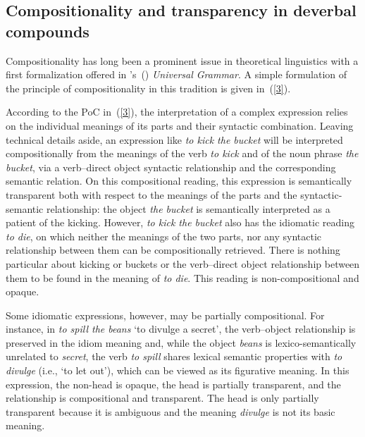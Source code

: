 \documentclass[output=paper]{langsci/langscibook}
\begin{document}
\subsection{Compositionality and transparency in deverbal compounds}\label{sec:intro:compositionality}

Compositionality has long been a prominent issue in theoretical linguistics with a first formalization offered in \citeauthor{montague:70}'s~(\citeyear{montague:70}) \textit{Universal Grammar}.
A simple formulation of the principle of compositionality in this tradition  {is given in~(\ref{3})}.

\begin{exe}
\end{exe}

According to the PoC in~(\ref{3}), the interpretation of a complex expression relies on the individual meanings of its parts and their syntactic combination. Leaving technical details aside, an expression like \textit{to kick the bucket} will be interpreted compositionally from the meanings of the verb \textit{to kick} and of the noun phrase \textit{the bucket}, via a verb--direct object syntactic relationship and the corresponding semantic relation. On this compositional reading, this expression is semantically transparent both with respect to the  meanings of the parts and the syntactic-semantic relationship: the object \textit{the bucket} is semantically interpreted as a patient of the kicking. However, \textit{to kick the bucket} also has the idiomatic reading \textit{to die}, on which neither the meanings of the two parts, nor any syntactic relationship between them can be compositionally retrieved. There is nothing particular about kicking or buckets or the verb--direct object relationship between them to be found in the meaning of \textit{to die}. This reading is non-compositional and  opaque.

Some idiomatic expressions, however, may be partially compositional. For instance, in \textit{to spill the beans} \lq to divulge a secret\rq, the verb--object relationship is preserved in the idiom meaning and, while the object \textit{beans} is lexico-semantically unrelated to \textit{secret}, the verb \textit{to spill} shares lexical semantic properties with \textit{to divulge} (i.e., \lq to let out\rq), which can be viewed as its figurative meaning. In this expression, the non-head is opaque, the head is partially transparent, and the relationship is compositional and transparent. The head is only partially transparent because it is ambiguous and the meaning \textit{divulge} is not its basic meaning.
\end{document}
